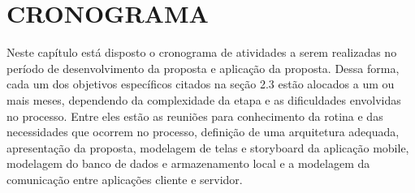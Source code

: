 








\section{CRONOGRAMA}
\label{sec:planejamento}

Neste capítulo está disposto o cronograma de atividades a serem realizadas no período de desenvolvimento da proposta e aplicação da proposta. Dessa forma, cada um dos objetivos específicos citados na seção 2.3 estão alocados a um ou mais meses, dependendo da complexidade da etapa e as dificuldades envolvidas no processo. Entre eles estão as reuniões para conhecimento da rotina e das necessidades que ocorrem no processo, definição de uma arquitetura adequada, apresentação da proposta, modelagem de telas e storyboard da aplicação mobile, modelagem do banco de dados e armazenamento local e a modelagem da comunicação entre aplicações cliente e servidor.

